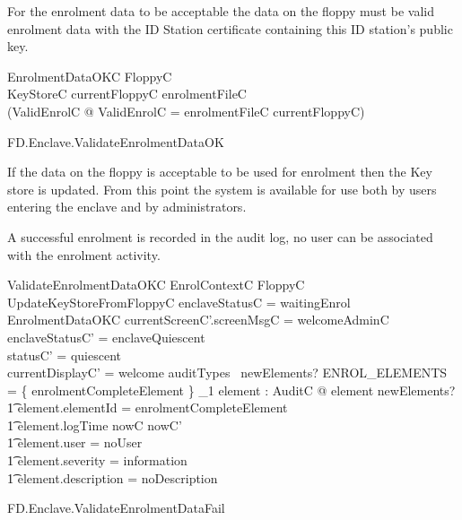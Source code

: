 For the enrolment data to be acceptable the data on the floppy must be
valid enrolment data with the ID Station certificate containing this
ID station's public key. 

\begin{schema}{EnrolmentDataOKC}
        FloppyC
\\      KeyStoreC
\where
        currentFloppyC \in \ran enrolmentFileC
\\      (\exists ValidEnrolC @ \theta ValidEnrolC = enrolmentFileC \inv
currentFloppyC)
\end{schema}

\begin{traceunit}{FD.Enclave.ValidateEnrolmentDataOK}
\end{traceunit}

If the data on the floppy is acceptable to be used for enrolment then
the Key store is updated. From this point the system is available for
use both by users entering the enclave and by administrators.

A successful enrolment is recorded in the audit log, no user can be
associated with the enrolment activity.

\begin{schema}{ValidateEnrolmentDataOKC}
        EnrolContextC
\also
        \Xi FloppyC
\\      UpdateKeyStoreFromFloppyC
\where
        enclaveStatusC = waitingEnrol
\also
        EnrolmentDataOKC
\also
        currentScreenC'.screenMsgC = welcomeAdminC
\also
        enclaveStatusC' = enclaveQuiescent 
\\      statusC' = quiescent
\\      currentDisplayC' = welcome
\also
        auditTypes~ newElements? \cap ENROL\_ELEMENTS = 
        \{ enrolmentCompleteElement \} 
\also
        \exists_1 element : AuditC @ element \in newElements? 
\\ \t1  \land element.elementId = enrolmentCompleteElement
\\ \t1  \land element.logTime \in nowC \upto nowC'
\\ \t1  \land element.user = noUser
\\ \t1  \land element.severity = information
\\ \t1  \land element.description = noDescription
\end{schema}

\begin{traceunit}{FD.Enclave.ValidateEnrolmentDataFail}
\end{traceunit}

